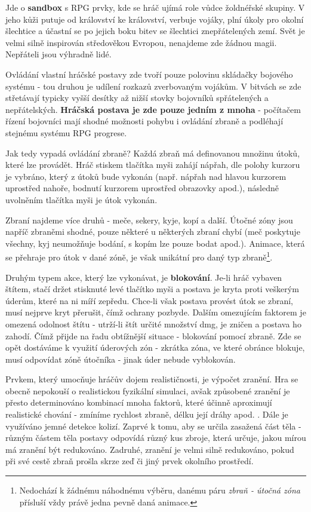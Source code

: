 Jde o \textbf{sandbox} s \acs{RPG} prvky, kde se hráč ujímá role vůdce žoldnéřské skupiny. V jeho kůži putuje od království ke království, verbuje vojáky, plní úkoly pro okolní šlechtice a účastní se po jejich boku bitev se šlechtici znepřátelených zemí. Svět je velmi silně inspirován středověkou Evropou, nenajdeme zde žádnou magii. Nepřáteli jsou výhradně lidé. 

Ovládání vlastní hráčské postavy zde tvoří pouze polovinu skládačky bojového systému - tou druhou je udílení rozkazů zverbovaným vojákům. V bitvách se zde střetávají typicky vyšší desítky až nižší stovky bojovníků spřátelených a nepřátelských. \textbf{Hráčská postava je zde pouze jedním z mnoha} - počítačem řízení bojovníci mají shodné možnosti pohybu i ovládání zbraně a podléhají stejnému systému \acs{RPG} progrese. 

Jak tedy vypadá ovládání zbraně? Každá zbraň má definovanou množinu útoků, které lze provádět. Hráč stiskem tlačítka myši zahájí nápřah, dle polohy kurzoru je vybráno, který z útoků bude vykonán (např. nápřah nad hlavou kurzorem uprostřed nahoře, bodnutí kurzorem uprostřed obrazovky apod.), následně uvolněním tlačítka myši je útok vykonán.

Zbraní najdeme více druhů - meče, sekery, kyje, kopí a další. Útočné zóny jsou napříč zbraněmi shodné, pouze některé u některých zbraní chybí (meč poskytuje všechny, kyj neumožňuje bodání, s kopím lze pouze bodat apod.). Animace, která se přehraje pro útok v dané zóně, je však unikátní pro daný typ zbraně\footnote{Nedochází k žádnému náhodnému výběru, danému páru \textit{zbraň - útočná zóna} přísluší vždy právě jedna pevně daná animace.}.

Druhým typem akce, který lze vykonávat, je \textbf{blokování}. Je-li hráč vybaven štítem, stačí držet stisknuté levé tlačítko myši a postava je kryta proti veškerým úderům, které na ni míří zepředu. Chce-li však postava provést útok se zbraní, musí nejprve kryt přerušit, čímž ochrany pozbyde. Dalším omezujícím faktorem je omezená odolnost štítu - utrží-li štít určité množství \acs{dmg}, je zničen a postava ho zahodí. Čímž přijde na řadu obtížnější situace - blokování pomocí zbraně. Zde se opět dostáváme k využití úderových zón - zkrátka zóna, ve které obránce blokuje, musí odpovídat zóně útočníka - jinak úder nebude vyblokován.

Prvkem, který umocňuje hráčův dojem realističnosti, je výpočet zranění. Hra se obecně nepokouší o realistickou fyzikální simulaci, avšak způsobené zranění je přesto determinováno kombinací mnoha faktorů, které účinně aproximují realistické chování - zmíníme rychlost zbraně, délku její dráhy apod. . Dále je využíváno jemné detekce kolizí. Zaprvé k tomu, aby se určila zasažená část těla - různým částem těla postavy odpovídá různý kus zbroje, která určuje, jakou mírou má zranění být redukováno. Zadruhé, zranění je velmi silně redukováno, pokud při své cestě zbraň prošla skrze zeď či jiný prvek okolního prostředí. 

